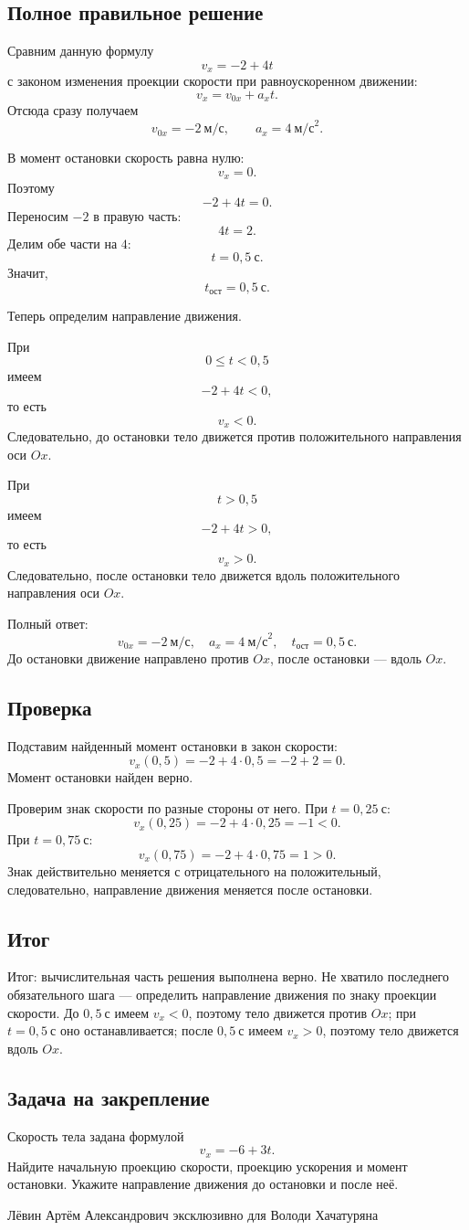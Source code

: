 \documentclass[12pt,a4paper]{article}
\begin{document}
\subsection*{Полное правильное решение}
Сравним данную формулу
\[
v_x=-2+4t
\]
с законом изменения проекции скорости при равноускоренном движении:
\[
v_x=v_{0x}+a_xt.
\]
Отсюда сразу получаем
\[
v_{0x}=-2\ \text{м/с},
\qquad
 a_x=4\ \text{м/с}^2.
\]

В момент остановки скорость равна нулю:
\[
v_x=0.
\]
Поэтому
\[
-2+4t=0.
\]
Переносим $-2$ в правую часть:
\[
4t=2.
\]
Делим обе части на $4$:
\[
t=0{,}5\ \text{с}.
\]
Значит,
\[
\boxed{t_{\text{ост}}=0{,}5\ \text{с}}.
\]

Теперь определим направление движения.

При
\[
0\le t<0{,}5
\]
имеем
\[
-2+4t<0,
\]
то есть
\[
v_x<0.
\]
Следовательно, до остановки тело движется против положительного направления оси $Ox$.

При
\[
t>0{,}5
\]
имеем
\[
-2+4t>0,
\]
то есть
\[
v_x>0.
\]
Следовательно, после остановки тело движется вдоль положительного направления оси $Ox$.

Полный ответ:
\[
\boxed{v_{0x}=-2\ \text{м/с},\quad a_x=4\ \text{м/с}^2,\quad t_{\text{ост}}=0{,}5\ \text{с}.}
\]
До остановки движение направлено против $Ox$, после остановки --- вдоль $Ox$.

\subsection*{Проверка}
Подставим найденный момент остановки в закон скорости:
\[
v_x(0{,}5)=-2+4\cdot0{,}5=-2+2=0.
\]
Момент остановки найден верно.

Проверим знак скорости по разные стороны от него. При $t=0{,}25\ \text{с}$:
\[
v_x(0{,}25)=-2+4\cdot0{,}25=-1<0.
\]
При $t=0{,}75\ \text{с}$:
\[
v_x(0{,}75)=-2+4\cdot0{,}75=1>0.
\]
Знак действительно меняется с отрицательного на положительный, следовательно, направление движения меняется после остановки.

\subsection*{Итог}
\textcolor{teal!60!black}{Итог:} вычислительная часть решения выполнена верно. Не хватило последнего обязательного шага --- определить направление движения по знаку проекции скорости. До $0{,}5\ \text{с}$ имеем $v_x<0$, поэтому тело движется против $Ox$; при $t=0{,}5\ \text{с}$ оно останавливается; после $0{,}5\ \text{с}$ имеем $v_x>0$, поэтому тело движется вдоль $Ox$.

\subsection*{Задача на закрепление}
Скорость тела задана формулой
\[
v_x=-6+3t.
\]
Найдите начальную проекцию скорости, проекцию ускорения и момент остановки. Укажите направление движения до остановки и после неё.

\vfill
\begin{center}
\small Лёвин Артём Александрович эксклюзивно для Володи Хачатуряна
\end{center}
\end{document}
